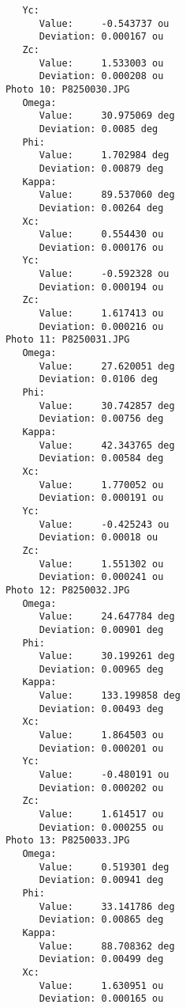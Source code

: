 \documentclass{article}
\begin{document}
\begin{verbatim}
               Yc:
                  Value:     -0.543737 ou
                  Deviation: 0.000167 ou
               Zc:
                  Value:     1.533003 ou
                  Deviation: 0.000208 ou
            Photo 10: P8250030.JPG
               Omega:
                  Value:     30.975069 deg
                  Deviation: 0.0085 deg
               Phi:
                  Value:     1.702984 deg
                  Deviation: 0.00879 deg
               Kappa:
                  Value:     89.537060 deg
                  Deviation: 0.00264 deg
               Xc:
                  Value:     0.554430 ou
                  Deviation: 0.000176 ou
               Yc:
                  Value:     -0.592328 ou
                  Deviation: 0.000194 ou
               Zc:
                  Value:     1.617413 ou
                  Deviation: 0.000216 ou
            Photo 11: P8250031.JPG
               Omega:
                  Value:     27.620051 deg
                  Deviation: 0.0106 deg
               Phi:
                  Value:     30.742857 deg
                  Deviation: 0.00756 deg
               Kappa:
                  Value:     42.343765 deg
                  Deviation: 0.00584 deg
               Xc:
                  Value:     1.770052 ou
                  Deviation: 0.000191 ou
               Yc:
                  Value:     -0.425243 ou
                  Deviation: 0.00018 ou
               Zc:
                  Value:     1.551302 ou
                  Deviation: 0.000241 ou
            Photo 12: P8250032.JPG
               Omega:
                  Value:     24.647784 deg
                  Deviation: 0.00901 deg
               Phi:
                  Value:     30.199261 deg
                  Deviation: 0.00965 deg
               Kappa:
                  Value:     133.199858 deg
                  Deviation: 0.00493 deg
               Xc:
                  Value:     1.864503 ou
                  Deviation: 0.000201 ou
               Yc:
                  Value:     -0.480191 ou
                  Deviation: 0.000202 ou
               Zc:
                  Value:     1.614517 ou
                  Deviation: 0.000255 ou
            Photo 13: P8250033.JPG
               Omega:
                  Value:     0.519301 deg
                  Deviation: 0.00941 deg
               Phi:
                  Value:     33.141786 deg
                  Deviation: 0.00865 deg
               Kappa:
                  Value:     88.708362 deg
                  Deviation: 0.00499 deg
               Xc:
                  Value:     1.630951 ou
                  Deviation: 0.000165 ou

\end{verbatim}
\end{document}
